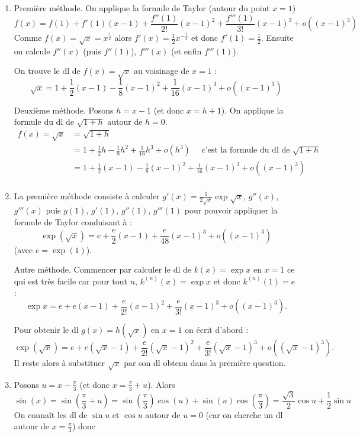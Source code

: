 \documentclass[11pt,a4paper]{article}
\begin{document}
\begin{enumerate}
  \item 
Première méthode.
On applique la formule de Taylor (autour du point $x=1$)
$$f(x)=f(1)+f'(1)(x-1)+\frac{f''(1)}{2!}(x-1)^2 + \frac{f'''(1)}{3!}(x-1)^3 + o((x-1)^3)$$
Comme $f(x) = \sqrt x= x^{\frac12}$ alors $f'(x) = \frac12 x^{-\frac12}$ et donc $f'(1)=\frac12$.
Ensuite on calcule $f''(x)$ (puis $f''(1)$), $f'''(x)$ (et enfin $f'''(1)$).

On trouve le dl de $f(x)=\sqrt x$ au voisinage de $x=1$ :
$$\sqrt x = 1 + \frac12 (x-1) - \frac18 (x-1)^2 + \frac{1}{16} (x-1)^3 + o((x-1)^3)$$


\bigskip

Deuxième méthode.
Posons $h=x-1$ (et donc $x=h+1$). On applique la formule du dl de $\sqrt{1+h}$ autour de $h=0$.
\begin{align*}
f(x)=\sqrt x  
  & = \sqrt{1+h} \\
  & = 1 + \frac 12 h - \frac18 h^2 + \frac{1}{16} h^3 + o(h^3)   \quad \text{ c'est la formule du dl de } \sqrt{1+h} \\
  & = 1 + \frac12 (x-1) - \frac18 (x-1)^2 + \frac{1}{16} (x-1)^3 + o((x-1)^3) \\
\end{align*}


  \item La première méthode consiste à calculer $g'(x)=\frac{1}{2\sqrt x}\exp{\sqrt x}$, $g''(x)$, $g'''(x)$
 puis $g(1)$, $g'(1)$, $g''(1)$, $g'''(1)$ pour pouvoir appliquer la formule de Taylor conduisant à :
$$\exp(\sqrt x)= e + \frac{e}{2} (x-1) + \frac{e}{48} (x-1)^3 + o((x-1)^3)$$
(avec $e=\exp(1)$).

\bigskip

Autre méthode. Commencer par calculer le dl de $k(x)=\exp x$ en $x=1$ ce qui est très facile car pour tout $n$, $k^{(n)}(x)=\exp x$
et donc $k^{(n)}(1)=e$ :
$$\exp x= e + e (x-1) + \frac{e}{2!} (x-1)^2 + \frac{e}{3!} (x-1)^3 + o((x-1)^3).$$

Pour obtenir le dl $g(x)= h(\sqrt x)$ en $x=1$ on écrit d'abord :
$$\exp (\sqrt x)= e + e (\sqrt{x}-1) + \frac{e}{2!} (\sqrt{x}-1)^2 + \frac{e}{3!} (\sqrt{x}-1)^3 + o((\sqrt{x}-1)^3).$$
Il reste alors à substituer $\sqrt{x}$ par son dl obtenu dans la première question.

  \item 

Posons $u=x-\frac\pi3$ (et donc $x=\frac\pi3+u$).
Alors 
$$\sin(x)=\sin(\frac\pi3+u) = \sin(\frac\pi3)\cos(u)+\sin(u)\cos(\frac\pi3) = \frac{\sqrt3}{2}\cos u +\frac12\sin u$$
On connaît les dl de $\sin u$ et $\cos u$ autour de $u=0$ (car on cherche un dl autour de $x=\frac\pi3$) donc


\end{enumerate}
\end{document}
